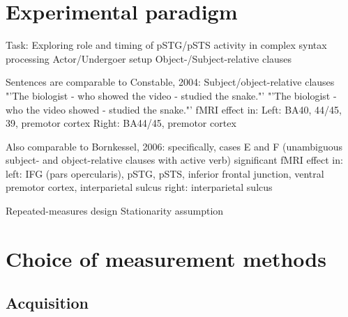 \section{Experimental paradigm}

Task: Exploring role and timing of pSTG/pSTS activity in complex syntax processing
Actor/Undergoer setup
Object-/Subject-relative clauses

Sentences are comparable to Constable, 2004:
Subject/object-relative clauses
"'The biologist - who showed the video - studied the snake."'
"'The biologist - who the video showed - studied the snake."'
fMRI effect in:
Left: BA40, 44/45, 39, premotor cortex
Right: BA44/45, premotor cortex

Also comparable to Bornkessel, 2006:
specifically, cases E and F (unambiguous subject- and object-relative clauses with active verb)
significant fMRI effect in:
left: IFG (pars opercularis), pSTG, pSTS, inferior frontal junction, ventral premotor cortex, interparietal sulcus
right: interparietal sulcus

Repeated-measures design
Stationarity assumption

\section{Choice of measurement methods}

\subsection{Acquisition}

